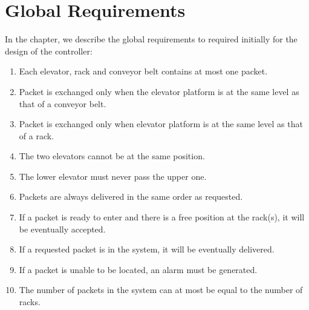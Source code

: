 \section*{Global Requirements}
\label{sec:global_req}
In the chapter, we describe the global requirements to required initially for the design of the controller:
\begin{enumerate}
\item Each elevator, rack and conveyor belt contains at most one packet.
\item Packet is exchanged only when the elevator platform is at the same level as that of a conveyor belt.
\item Packet is exchanged only when elevator platform is at the same level as that of a rack.
\item The two elevators cannot be at the same position.
\item The lower elevator must never pass the upper one.
\item Packets are always delivered in the same order as requested.
\item If a packet is ready to enter and there is a free position at the rack(s), it will be eventually accepted.
\item If a requested packet is in the system, it will be eventually delivered. %
\item If a packet is unable to be located, an alarm must be generated.
\item The number of packets in the system can at most be equal to the number of racks.
 



\end{enumerate}